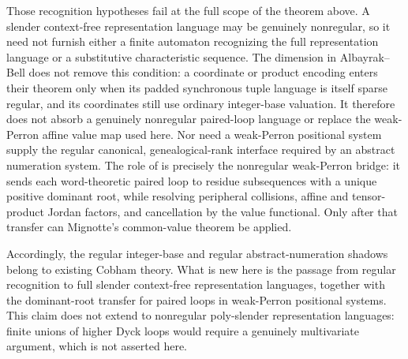 \begin{remark}
  Those recognition hypotheses fail at the full scope of the theorem above.
  A slender context-free representation language may be genuinely
  nonregular, so it need not furnish either a finite automaton recognizing
  the full representation language or a substitutive characteristic
  sequence. The dimension in Albayrak--Bell does not remove this condition:
  a coordinate or product encoding enters their theorem only when its padded
  synchronous tuple language is itself sparse regular, and its coordinates
  still use ordinary integer-base valuation. It therefore does not absorb a
  genuinely nonregular paired-loop language or replace the weak-Perron affine
  value map used here. Nor need a weak-Perron positional system supply the
  regular canonical, genealogical-rank interface required by an abstract
  numeration system.
  The role of  is precisely the
  nonregular weak-Perron bridge: it sends each word-theoretic paired loop to
  residue subsequences with a unique positive dominant root, while resolving
  peripheral collisions, affine and tensor-product Jordan factors, and
  cancellation by the value functional. Only after that transfer can
  Mignotte's common-value theorem be applied.

  Accordingly, the regular integer-base and regular abstract-numeration
  shadows belong to existing Cobham theory. What is new here is the passage
  from regular recognition to full slender context-free representation
  languages, together with the dominant-root transfer for paired loops in
  weak-Perron positional systems. This claim does not extend to nonregular
  poly-slender representation languages: finite unions of higher Dyck loops
  would require a genuinely multivariate argument, which is not asserted
  here.
\end{remark}
